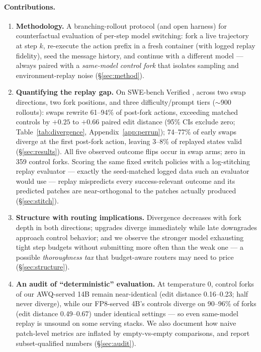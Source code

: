 \documentclass{article}
\begin{document}
\paragraph{Contributions.}
\begin{enumerate}
\item \textbf{Methodology.} A branching-rollout protocol (and open harness) for counterfactual evaluation of per-step model switching: fork a live trajectory at step $k$, re-execute the action prefix in a fresh container (with logged replay fidelity), seed the message history, and continue with a different model --- always paired with a \emph{same-model control fork} that isolates sampling and environment-replay noise (\S\ref{sec:method}).
\item \textbf{Quantifying the replay gap.} On SWE-bench Verified \citep{jimenez2024swebench}, across two swap directions, two fork positions, and three difficulty/prompt tiers ($\sim$900 rollouts): swaps rewrite 61--94\% of post-fork actions, exceeding matched controls by $+0.25$ to $+0.66$ paired edit distance (95\% CIs exclude zero; Table~\ref{tab:divergence}, Appendix~\ref{app:perrun}); 74--77\% of early swaps diverge at the first post-fork action, leaving 3--8\% of replayed states valid (\S\ref{sec:results}). All five observed outcome flips occur in swap arms; zero in 359 control forks. Scoring the same fixed switch policies with a log-stitching replay evaluator --- exactly the seed-matched logged data such an evaluator would use --- replay mispredicts every success-relevant outcome and its predicted patches are near-orthogonal to the patches actually produced (\S\ref{sec:stitch}).
\item \textbf{Structure with routing implications.} Divergence decreases with fork depth in both directions; upgrades diverge immediately while late downgrades approach control behavior; and we observe the stronger model exhausting tight step budgets without submitting more often than the weak one --- a possible \emph{thoroughness tax} that budget-aware routers may need to price (\S\ref{sec:structure}).
\item \textbf{An audit of ``deterministic'' evaluation.} At temperature 0, control forks of our AWQ-served 14B remain near-identical (edit distance 0.16--0.23; half never diverge), while our FP8-served 4B's controls diverge on 90--96\% of forks (edit distance 0.49--0.67) under identical settings --- so even same-model replay is unsound on some serving stacks. We also document how naive patch-level metrics are inflated by empty-vs-empty comparisons, and report subset-qualified numbers (\S\ref{sec:audit}).
\end{enumerate}
\end{document}
